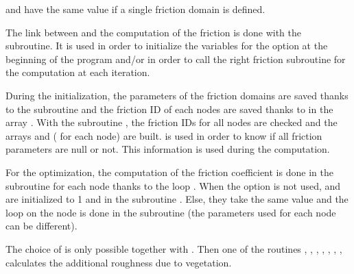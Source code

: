  and 
have the same value if a single friction domain is defined.





The link between  and the computation of the friction is done
with the  subroutine.
It is used in order to initialize the variables for the option
 at the beginning of the program and/or in order to call
the right friction subroutine for the computation at each iteration.

\textbf{}

During the initialization, the parameters of the friction domains are saved
thanks to the  subroutine and the friction ID of each nodes
are saved thanks to  in the array .
With the subroutine , the friction IDs for all nodes are
checked and the arrays  and 
( for each node) are built.
 is used in order to know if all friction parameters are null or
not.
This information is used during the computation.

\textbf{}

For the optimization, the computation of the friction coefficient is done
in the  subroutine for each node thanks to the loop
.
When the option  is not used,  and
 are initialized to 1 and  in the subroutine
.
Else, they take the same value and the loop on the node is done in the
 subroutine (the parameters used for each node can be
different).

The choice of  is only possible together with
 . Then one of the  routines 
, , , 
, , 
, 
, 
calculates the additional roughness due to vegetation. 

